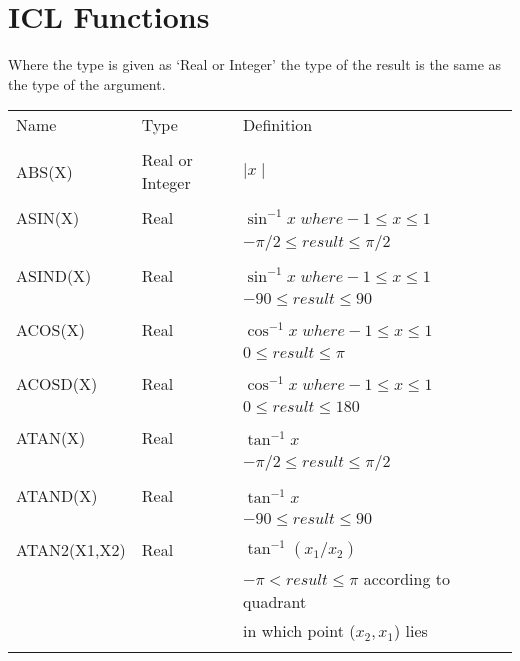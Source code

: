 \appendix
\chapter{ICL Functions}  

Where the type is given as `Real or Integer' the type of the result is the
same as the type of the argument.
\begin{center}
\begin{tabular}{llll}

Name & Type & Definition \\ 
\\
ABS(X) & Real or Integer & $\mid x \mid$\\
\\
ASIN(X) & Real & $\sin^{-1} x \; where -1 \leq x \leq 1 $\\
   &  &  $ -\pi/2 \leq result \leq \pi/2$\\
\\
ASIND(X) & Real & $\sin^{-1} x \; where -1 \leq x \leq 1 $\\
   &  &  $ -90 \leq result \leq 90$\\
\\
ACOS(X) & Real & $\cos^{-1} x \; where -1 \leq x \leq 1 $\\
   &  &  $ 0 \leq result \leq \pi$\\
\\
ACOSD(X) & Real & $\cos^{-1} x \; where -1 \leq x \leq 1 $\\
   &  &  $ 0 \leq result \leq 180$\\
\\
ATAN(X) & Real & $\tan^{-1} x $ \\
   &  &  $ -\pi/2 \leq result \leq \pi/2$\\
\\
ATAND(X) & Real & $\tan^{-1} x $ \\
   &  &  $ -90 \leq result \leq 90$\\
\\
ATAN2(X1,X2) & Real & $\tan^{-1} (x_{1}/x_{2}) $\\
   & & $ -\pi < result \leq \pi $ according to quadrant \\
   & & in which point ($x_{2},x_{1}$) lies\\
\\
\end{tabular}
\end{center}
\newpage

